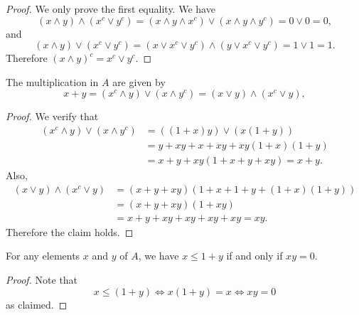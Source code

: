 \begin{proof}
We only prove the first equality. We have
\[(x\wedge y)\wedge(x^c\vee y^c)=(x\wedge y\wedge x^c)\vee(x\wedge y\wedge y^c)=0\vee 0=0,\]
and
\[(x\wedge y)\vee(x^c\vee y^c)=(x\vee x^c\vee y^c)\wedge(y\vee x^c\vee y^c)=1\vee 1=1.\]
Therefore $(x\wedge y)^c=x^c\vee y^c$.
\end{proof}
\begin{proposition}\label{Bool ring mult as cap cup}
The multiplication in $A$ are given by
\[x+y=(x^c\wedge y)\vee(x\wedge y^c)=(x\vee y)\wedge(x^c\vee y),\]
\end{proposition}
\begin{proof}
We verify that
\begin{align*}
(x^c\wedge y)\vee(x\wedge y^c)&=((1+x)y)\vee(x(1+y))\\
&=y+xy+x+xy+xy(1+x)(1+y)\\
&=x+y+xy(1+x+y+xy)=x+y.
\end{align*}
Also,
\begin{align*}
(x\vee y)\wedge(x^c\vee y)&=(x+y+xy)(1+x+1+y+(1+x)(1+y))\\
&=(x+y+xy)(1+xy)\\
&=x+y+xy+xy+xy+xy=xy. 
\end{align*}
Therefore the claim holds.
\end{proof}
\begin{lemma}\label{Bool ring x leq 1+y}
For any elements $x$ and $y$ of $A$, we have $x\leq 1+y$ if and only if $xy=0$.
\end{lemma}
\begin{proof}
Note that
\[x\leq(1+y)\iff x(1+y)=x\iff xy=0\]
as claimed.
\end{proof}
